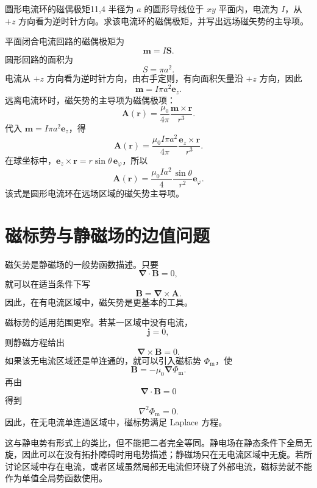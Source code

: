 \begin{example}{圆形电流环的磁偶极矩}{11,4}
	半径为 $a$ 的圆形导线位于 $xy$ 平面内，电流为 $I$，从 $+z$ 方向看为逆时针方向。求该电流环的磁偶极矩，并写出远场磁矢势的主导项。
	
	\begin{solution}
		平面闭合电流回路的磁偶极矩为
		\[
		\bm{m}=I\bm{S}.
		\]
		圆形回路的面积为
		\[
		S=\pi a^{2}.
		\]
		电流从 $+z$ 方向看为逆时针方向，由右手定则，有向面积矢量沿 $+z$ 方向，因此
		\[
		\bm{m}
		=
		I\pi a^{2}\bm{e}_{z}.
		\]
		远离电流环时，磁矢势的主导项为磁偶极项：
		\[
		\bm{A}(\bm{r})
		=
		\frac{\mu_{0}}{4\pi}
		\frac{\bm{m}\times\bm{r}}{r^{3}}.
		\]
		代入 $\bm{m}=I\pi a^{2}\bm{e}_{z}$，得
		\[
		\bm{A}(\bm{r})
		=
		\frac{\mu_{0}I\pi a^{2}}{4\pi}
		\frac{\bm{e}_{z}\times\bm{r}}{r^{3}}.
		\]
		在球坐标中，$\bm{e}_{z}\times\bm{r}=r\sin\theta\,\bm{e}_{\varphi}$，所以
		\[
		\bm{A}(\bm{r})
		=
		\frac{\mu_{0}Ia^{2}}{4}
		\frac{\sin\theta}{r^{2}}\bm{e}_{\varphi}.
		\]
		该式是圆形电流环在远场区域的磁矢势主导项。
	\end{solution}
\end{example}

\section{磁标势与静磁场的边值问题}

磁矢势是静磁场的一般势函数描述。只要
\[
\bm{\nabla}\cdot\bm{B}=0,
\]
就可以在适当条件下写
\[
\bm{B}
=
\bm{\nabla}\times\bm{A}.
\]
因此，在有电流区域中，磁矢势是更基本的工具。

磁标势的适用范围更窄。若某一区域中没有电流，
\[
\bm{j}=0,
\]
则静磁方程给出
\[
\bm{\nabla}\times\bm{B}=0.
\]
如果该无电流区域还是单连通的，就可以引入磁标势 $\Phi_{\mathrm{m}}$，使
\begin{equation}
	\bm{B}
	=
	-\mu_{0}\bm{\nabla}\Phi_{\mathrm{m}}.
	\label{eq:11:magnetic-scalar-potential-vacuum}
\end{equation}
再由
\[
\bm{\nabla}\cdot\bm{B}=0
\]
得到
\begin{equation}
	\nabla^{2}\Phi_{\mathrm{m}}=0.
	\label{eq:11:magnetic-scalar-laplace}
\end{equation}
因此，在无电流单连通区域中，磁标势满足 Laplace 方程。

这与静电势有形式上的类比，但不能把二者完全等同。静电场在静态条件下全局无旋，因此可以在没有拓扑障碍时用电势描述；静磁场只在无电流区域中无旋。若所讨论区域中存在电流，或者区域虽然局部无电流但环绕了外部电流，磁标势就不能作为单值全局势函数使用。

